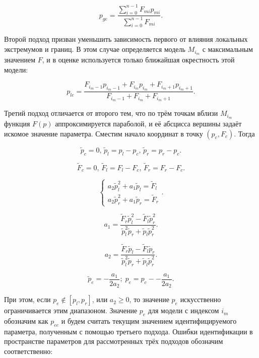\documentclass[a4paper,paratype,12pt,fouriernc]{cmonogra}
\begin{document}
\begin{equation}
  p_{ge}
  =
  \frac{\sum\limits_{i=0}^{n-1} F_{mi} p_{mi}}
       {\sum\limits_{i=0}^{n-1} F_{mi} }
  .
  \label{atu:eq:p_ge}
\end{equation}

Второй подход призван уменьшить зависимость первого
от влияния локальных экстремумов и границ. В этом
случае определяется модель $M_{i_{m}}$ с максимальным значением
$F$, и в оценке используется только ближайшая окрестность этой модели:

\begin{equation}
  p_{le}
  =
  \frac{ F_{i_m-1} p_{i_m-1} + F_{i_m} p_{i_m} + F_{i_m+1} p_{i_m+1} }
       { F_{i_m-1} + F_{i_m} + F_{i_m+1} }
  .
  \label{atu:eq:p_le}
\end{equation}

Третий подход отличается от второго тем, что по трём точкам вблизи  $M_{i_{m}}$
функция $F(p)$ аппроксимируется параболой, и её абсцисса вершины задаёт искомое
значение параметра. Сместим начало координат в точку
$ ( p_c, F_c ) $. Тогда

\[
  \tilde{p}_c = 0, \,
  \tilde{p}_l = p_l - p_c, \,
  \tilde{p}_r = p_r - p_c.
\]

\[
  \tilde{F}_c = 0, \,
  \tilde{F}_l = F_l - F_c, \,
  \tilde{F}_r = F_r - F_c.
\]

\[
  \left\{
    \begin{array}{l}
      a_2 \tilde{p}_l^2 + a_1 \tilde{p}_l  = \tilde{F}_l
      \\
      a_2 \tilde{p}_r^2 + a_1 \tilde{p}_r  = \tilde{F}_r
    \end{array}
  \right. .
\]

\[
  a_1 = \frac{\tilde{F}_r \tilde{p}_l^2 - \tilde{F}_l \tilde{p}_r^2 }
             { \tilde{p}_l^2 \tilde{p}_r  + \tilde{p}_l \tilde{p}_r^2 }.
\]

\[
  a_2 = \frac{\tilde{F}_r \tilde{p}_l - \tilde{F}_l \tilde{p}_r }
             { \tilde{p}_l^2 \tilde{p}_r  + \tilde{p}_l \tilde{p}_r^2 }.
\]

\begin{equation}
  \tilde{p}_e = - \frac{a_1}{2 a_2};
  \;
  p_e = p_c -- \frac{a_1}{2 a_2}.
  \label{atu:eq:p_e}
\end{equation}


При этом, если
$ p_e \notin [ p_l, p_r ] $, или $ a_2 \ge 0 $, то значение $p_e$ искусственно
ограничивается этим диапазоном. Значение $p_e$ для модели с индексом
$i_m$ обозначим как $p_{ee}$ и будем считать
текущим значением идентифицируемого параметра, полученным с помощью
третьего подхода. Ошибки идентификации в пространстве параметров
для рассмотренных трёх подходов обозначим соответственно:
\end{document}

